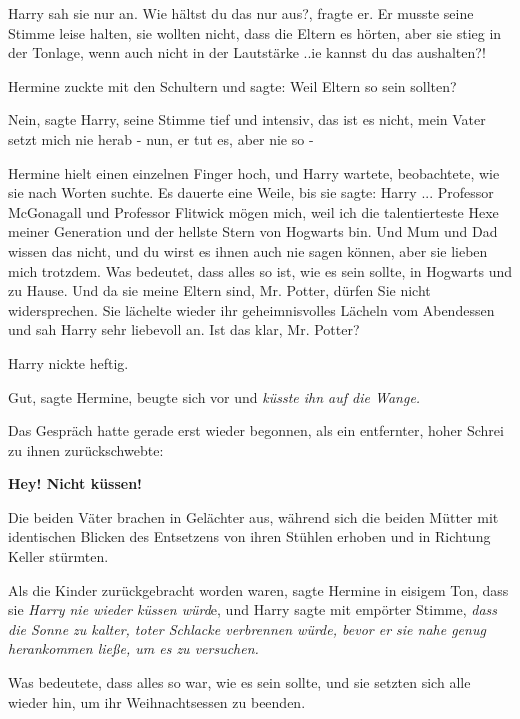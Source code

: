 Harry sah sie nur an. \glqq{}Wie hältst du das nur aus?\grqq{}, fragte er. Er
musste seine Stimme leise halten, sie wollten nicht, dass die Eltern es hörten,
aber sie stieg in der Tonlage, wenn auch nicht in der Lautstärke .\grqq{}.ie
kannst du das aushalten?!\grqq{}

Hermine zuckte mit den Schultern und sagte: \glqq{}Weil Eltern so sein sollten?\grqq{}

\glqq{}Nein\grqq{}, sagte Harry, seine Stimme tief und intensiv, \glqq{}das ist es
nicht, mein Vater setzt mich nie herab - nun, er tut es, aber nie so -\grqq{}

Hermine hielt einen einzelnen Finger hoch, und Harry wartete, beobachtete, wie
sie nach Worten suchte. Es dauerte eine Weile, bis sie sagte: \glqq{}Harry ...
Professor McGonagall und Professor Flitwick mögen mich, weil ich die
talentierteste Hexe meiner Generation und der hellste Stern von Hogwarts bin.
Und Mum und Dad wissen das nicht, und du wirst es ihnen auch nie sagen können,
aber sie lieben mich trotzdem. Was bedeutet, dass alles so ist, wie es sein
sollte, in Hogwarts und zu Hause. Und da sie meine Eltern sind, Mr. Potter,
dürfen Sie nicht widersprechen.\grqq{} Sie lächelte wieder ihr geheimnisvolles Lächeln
vom Abendessen und sah Harry sehr liebevoll an. \glqq{}Ist das klar, Mr. Potter?\grqq{}

Harry nickte heftig.

\glqq{}Gut\grqq{}, sagte Hermine, beugte sich vor und \emph{küsste ihn auf die
Wange.}

Das Gespräch hatte gerade erst wieder begonnen, als ein entfernter, hoher Schrei
zu ihnen zurückschwebte:

\textbf{ \glqq{}Hey! Nicht küssen!\grqq{}}

Die beiden Väter brachen in Gelächter aus, während sich die beiden Mütter mit
identischen Blicken des Entsetzens von ihren Stühlen erhoben und in Richtung
Keller stürmten.

Als die Kinder zurückgebracht worden waren, sagte Hermine in eisigem Ton, dass
sie \emph{Harry nie wieder küssen würd}e, und Harry sagte mit empörter Stimme,
\emph{dass die Sonne zu kalter, toter Schlacke verbrennen würde, bevor er sie
nahe genug herankommen ließe, um es zu versuchen.}

Was bedeutete, dass alles so war, wie es sein sollte, und sie setzten sich alle
wieder hin, um ihr Weihnachtsessen zu beenden.

